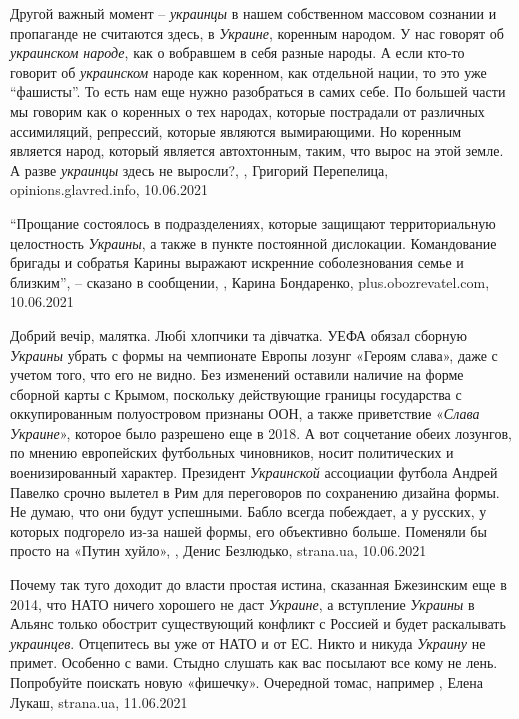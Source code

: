 Другой важный момент – \emph{украинцы} в нашем собственном массовом сознании и
пропаганде не считаются здесь, в \emph{Украине}, коренным народом. У нас говорят об
\emph{украинском народе}, как о вобравшем в себя разные народы. А если кто-то говорит
об \emph{украинском} народе как коренном, как отдельной нации, то это уже \enquote{фашисты}.
То есть нам еще нужно разобраться в самих себе. По большей части мы говорим как
о коренных о тех народах, которые пострадали от различных ассимиляций,
репрессий, которые являются вымирающими. Но коренным является народ, который
является автохтонным, таким, что вырос на этой земле. А разве \emph{украинцы} здесь не
выросли?,
, 
Григорий Перепелица, opinions.glavred.info, 10.06.2021

\enquote{Прощание состоялось в подразделениях, которые защищают территориальную
целостность \emph{Украины}, а также в пункте постоянной дислокации. Командование
бригады и собратья Карины выражают искренние соболезнования семье и близким}, –
сказано в сообщении,
, 
Карина Бондаренко, plus.obozrevatel.com, 10.06.2021

Добрий вечір, малятка. Любі хлопчики та дівчатка.  УЕФА обязал сборную
\emph{Украины} убрать с формы на чемпионате Европы лозунг «Героям слава», даже
с учетом того, что его не видно. Без изменений оставили наличие на форме
сборной карты с Крымом, поскольку действующие границы государства с
оккупированным полуостровом признаны ООН, а также приветствие «\emph{Слава
Украине}», которое было разрешено еще в 2018. А вот соцчетание обеих лозунгов,
по мнению европейских футбольных чиновников, носит политических и
военизированный характер. Президент \emph{Украинской} ассоциации футбола Андрей
Павелко срочно вылетел в Рим для переговоров по сохранению дизайна формы. Не
думаю, что они будут успешными. Бабло всегда побеждает, а у русских, у которых
подгорело из-за нашей формы, его объективно больше. Поменяли бы просто на
«Путин хуйло»,
, Денис Безлюдько, strana.ua, 10.06.2021

Почему так туго доходит до власти простая истина, сказанная Бжезинским еще в
2014, что НАТО ничего хорошего не даст \emph{Украине}, а вступление \emph{Украины} в Альянс
только обострит существующий конфликт с Россией и будет раскалывать \emph{украинцев}.
Отцепитесь вы уже от НАТО и от ЕС.  Никто и никуда \emph{Украину} не примет. Особенно
с вами.  Стыдно слушать как вас посылают все кому не лень.  Попробуйте поискать
новую «фишечку».  Очередной томас, например
, Елена Лукаш, strana.ua, 11.06.2021 

